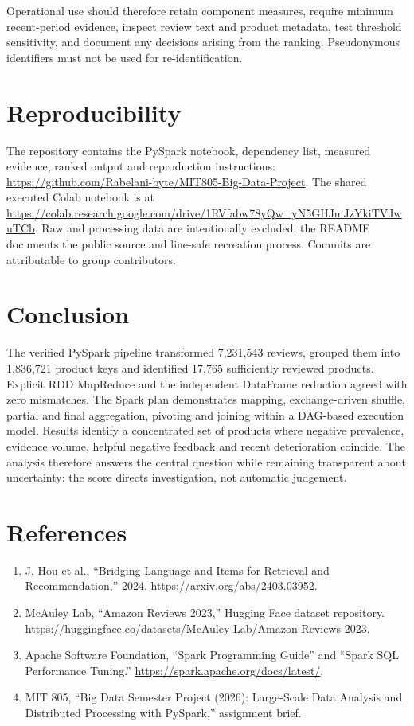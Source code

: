 \documentclass[10pt,a4paper]{article}
\begin{document}
Operational use should therefore retain component measures, require minimum recent-period evidence, inspect review text and product metadata, test threshold sensitivity, and document any decisions arising from the ranking. Pseudonymous identifiers must not be used for re-identification.

\section{Reproducibility}

The repository contains the PySpark notebook, dependency list, measured evidence, ranked output and reproduction instructions: \url{https://github.com/Rabelani-byte/MIT805-Big-Data-Project}. The shared executed Colab notebook is at \url{https://colab.research.google.com/drive/1RVfabw78yQw_yN5GHJmJzYkiTVJwuTCb}. Raw and processing data are intentionally excluded; the README documents the public source and line-safe recreation process. Commits are attributable to group contributors.

\newpage
\section{Conclusion}

The verified PySpark pipeline transformed 7,231,543 reviews, grouped them into 1,836,721 product keys and identified 17,765 sufficiently reviewed products. Explicit RDD MapReduce and the independent DataFrame reduction agreed with zero mismatches. The Spark plan demonstrates mapping, exchange-driven shuffle, partial and final aggregation, pivoting and joining within a DAG-based execution model. Results identify a concentrated set of products where negative prevalence, evidence volume, helpful negative feedback and recent deterioration coincide. The analysis therefore answers the central question while remaining transparent about uncertainty: the score directs investigation, not automatic judgement.

\section*{References}
\small
\begin{enumerate}
\item J. Hou et al., ``Bridging Language and Items for Retrieval and Recommendation,'' 2024. \url{https://arxiv.org/abs/2403.03952}.
\item McAuley Lab, ``Amazon Reviews 2023,'' Hugging Face dataset repository. \url{https://huggingface.co/datasets/McAuley-Lab/Amazon-Reviews-2023}.
\item Apache Software Foundation, ``Spark Programming Guide'' and ``Spark SQL Performance Tuning.'' \url{https://spark.apache.org/docs/latest/}.
\item MIT 805, ``Big Data Semester Project (2026): Large-Scale Data Analysis and Distributed Processing with PySpark,'' assignment brief.
\end{enumerate}
\end{document}
